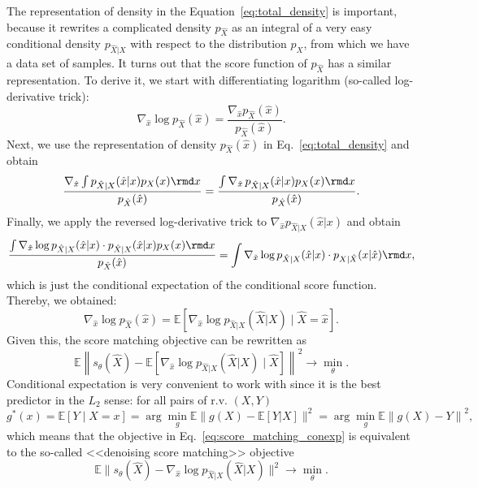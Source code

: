 The representation of density in the Equation~\ref{eq:total_density} is important, because it rewrites a complicated density $p_{\hat{X}}$ as an integral of a very easy conditional density $p_{\hat{X} | X}$ with respect to the distribution $p_X$, from which we have a data set of samples. It turns out that the score function of $p_{\hat{X}}$ has a similar representation. To derive it, we start with differentiating logarithm (so-called log-derivative trick):
\[
    \nabla_{\hat{x}} \log p_{\hat{X}}(\hat{x}) = \frac{\nabla_{\hat{x}} p_{\hat{X}}(\hat{x})}{p_{\hat{X}}(\hat{x})}.
\]
Next, we use the representation of density $p_{\hat{X}}(\hat{x})$ in Eq.~\ref{eq:total_density} and obtain
\[
    \frac{\nabla_{\hat{x}}\int p_{\hat{X} | X}(\hat{x} | x)p_{X}(x) \rmd x}{p_{\hat{X}}(\hat{x})} = \frac{\int \nabla_{\hat{x}}\,p_{\hat{X} | X}(\hat{x} | x)p_{X}(x) \rmd x}{p_{\hat{X}}(\hat{x})}.
\]
Finally, we apply the reversed log-derivative trick to $\nabla_{\hat{x}} p_{\hat{X} | X}(\hat{x} | x)$ and obtain
\[
    \frac{\int \nabla_{\hat{x}}\log p_{\hat{X} | X}(\hat{x} | x) \cdot p_{\hat{X} | X}(\hat{x} | x)p_{X}(x) \rmd x}{p_{\hat{X}}(\hat{x})} = \int \nabla_{\hat{x}}\log p_{\hat{X} | X}(\hat{x} | x) \cdot p_{X | \hat{X}}(x | \hat{x}) \rmd x,
\]
which is just the conditional expectation of the conditional score function. Thereby, we obtained:
\begin{equation}\label{eq:score_condexp}
    \nabla_{\hat{x}} \log p_{\hat{X}}(\hat{x}) = \mathbb{E}\left[\nabla_{\hat{x}} \log p_{\hat{X} | X}(\hat{X} | X) \mid  \hat{X} = \hat{x}\right].
\end{equation}
Given this, the score matching objective can be rewritten as
\begin{equation}\label{eq:score_matching_conexp}
    \mathbb{E}\left\|s_\theta(\hat{X}) - \mathbb{E}\left[\nabla_{\hat{x}}\log p_{\hat{X} | X}(\hat{X} | X) \mid \hat{X}\right] \right\|^2 \rightarrow \min\limits_{\theta}.
\end{equation}
Conditional expectation is very convenient to work with since it is the best predictor in the $L_2$ sense: for all pairs of r.v. $(X, Y)$
\[
    g^*(x) = \mathbb{E}[Y \mid X = x] = \arg \min\limits_{g} \mathbb{E}\|g(X) - \mathbb{E}\left[Y | X\right] \|^2 = \arg\min\limits_{g} \mathbb{E}\left\|g(X) - Y \right\|^2,
\]
which means that the objective in Eq.~\ref{eq:score_matching_conexp} is equivalent to the so-called <<denoising score matching>> objective
\begin{equation}\label{eq:denoising_score_matching}
    \mathbb{E}\|s_\theta(\hat{X}) - \nabla_{\hat{x}}\log p_{\hat{X} | X}(\hat{X} | X) \|^2 \rightarrow \min\limits_{\theta}.
\end{equation}

